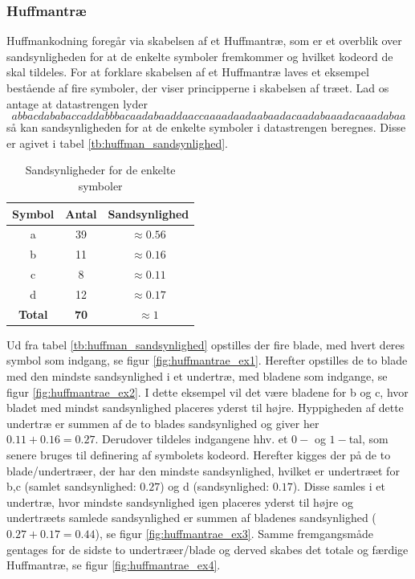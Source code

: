 \subsubsection{Huffmantræ}
\label{sec:huffmanteori}
Huffmankodning foregår via skabelsen af et Huffmantræ, som er et overblik over sandsynligheden for at de enkelte symboler fremkommer og hvilket kodeord de skal tildeles. For at forklare skabelsen af et Huffmantræ laves et eksempel bestående af fire symboler, der viser principperne i skabelsen af træet.
Lad os antage at datastrengen lyder $$ abbacdababaccaddabbbacaadabaaddaaccaaaadaadaabaadacaadabaaadacaaadabaa
 $$ så kan sandsynligheden for at de enkelte symboler i datastrengen beregnes. Disse er agivet i tabel \vref{tb:huffman_sandsynlighed}.
\begin{table}[!h]
\centering
\begin{tabular}{|c|c|c|} 
\hline
\textbf{Symbol}	&	\textbf{Antal}	&	\textbf{Sandsynlighed}			\\ \hline
a		&	39		&	$\approx  0.56$	\\ \hline
b		&	11		&	$\approx  0.16$	\\ \hline
c		&	8		&	$\approx  0.11$	\\ \hline
d		&	12		&	$\approx  0.17$	\\ \hline
\textbf{Total}	&	\textbf{70}		&	\textbf{$\approx 1$}				\\ \hline
\end{tabular}
\caption{Sandsynligheder for de enkelte symboler}
\label{tb:huffman_sandsynlighed}
\end{table}

Ud fra tabel \vref{tb:huffman_sandsynlighed} opstilles der fire blade, med hvert deres symbol som indgang, se figur \vref{fig:huffmantrae_ex1}. Herefter opstilles de to blade med den mindste sandsynlighed i et undertræ, med bladene som indgange, se figur \vref{fig:huffmantrae_ex2}. I dette eksempel vil det være bladene for b og c, hvor bladet med mindst sandsynlighed placeres yderst til højre. Hyppigheden af dette undertræ er summen af de to blades sandsynlighed og giver her $0.11+0.16=0.27$. Derudover tildeles indgangene hhv. et $0-$ og $1-$tal, som senere bruges til definering af symbolets kodeord. Herefter kigges der på de to blade/undertræer, der har den mindste sandsynlighed, hvilket er undertræet for b,c (samlet sandsynlighed: $0.27$) og d (sandsynlighed: $0.17$). Disse samles i et undertræ, hvor mindste sandsynlighed igen placeres yderst til højre og undertræets samlede sandsynlighed er summen af bladenes sandsynlighed ($0.27+0.17=0.44$), se figur \vref{fig:huffmantrae_ex3}. Samme fremgangsmåde gentages for de sidste to undertræer/blade og derved skabes det totale og færdige Huffmantræ, se figur \vref{fig:huffmantrae_ex4}.

